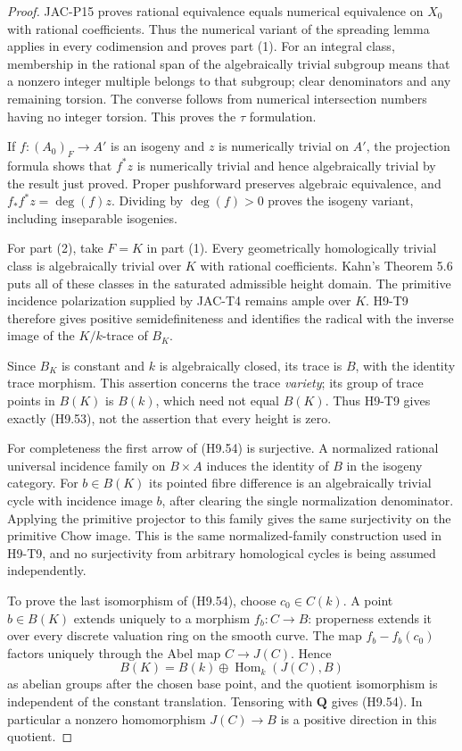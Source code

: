 \documentclass[11pt,a4paper]{article}
\begin{document}
\begin{proof}
JAC-P15 proves rational equivalence equals numerical equivalence on
$X_0$ with rational coefficients. Thus the numerical variant of the
spreading lemma applies in every codimension and proves part (1).
For an integral class, membership in the rational span of the
algebraically trivial subgroup means that a nonzero integer multiple
belongs to that subgroup; clear denominators and any remaining
torsion. The converse follows from numerical intersection numbers
having no integer torsion. This proves the $\tau$ formulation.

If $f:(A_0)_F\to A'$ is an isogeny and $z$ is numerically trivial
on $A'$, the projection formula shows that $f^*z$ is numerically
trivial and hence algebraically trivial by the result just proved.
Proper pushforward preserves algebraic
equivalence, and $f_*f^*z=\deg(f)z$. Dividing by $\deg(f)>0$
proves the isogeny variant, including inseparable isogenies.

For part (2), take $F=K$ in part (1). Every geometrically
homologically trivial class is algebraically trivial over $K$ with
rational coefficients. Kahn's Theorem 5.6 puts all of these classes
in the saturated admissible height domain. The primitive incidence
polarization supplied by JAC-T4 remains ample over $K$.
H9-T9 therefore gives positive semidefiniteness and identifies the
radical with the inverse image of the $K/k$-trace of $B_K$.

Since $B_K$ is constant and $k$ is algebraically closed, its trace is
$B$, with the identity trace morphism. This assertion concerns the
trace \emph{variety}; its group of trace points in $B(K)$ is
$B(k)$, which need not equal $B(K)$. Thus H9-T9 gives exactly
(H9.53), not the assertion that every height is zero.

For completeness the first arrow of (H9.54) is surjective.
A normalized rational universal incidence family on $B\times A$
induces the identity of $B$ in the isogeny category. For $b\in B(K)$
its pointed fibre difference is an algebraically trivial cycle with
incidence image $b$, after clearing the single normalization
denominator. Applying the primitive projector to this family gives
the same surjectivity on the primitive Chow image. This is the same
normalized-family construction used in H9-T9, and no surjectivity
from arbitrary homological cycles is being assumed independently.

To prove the last isomorphism of (H9.54), choose $c_0\in C(k)$.
A point $b\in B(K)$ extends uniquely to a morphism $f_b:C\to B$:
properness extends it over every discrete valuation ring on the
smooth curve. The map $f_b-f_b(c_0)$ factors uniquely through the
Abel map $C\to J(C)$. Hence
\[
 B(K)=B(k)\oplus\operatorname{Hom}_k(J(C),B)
\]
as abelian groups after the chosen base point, and the quotient
isomorphism is independent of the constant translation. Tensoring
with $\mathbf Q$ gives (H9.54). In particular a nonzero homomorphism
$J(C)\to B$ is a positive direction in this quotient.


\end{proof}
\end{document}
